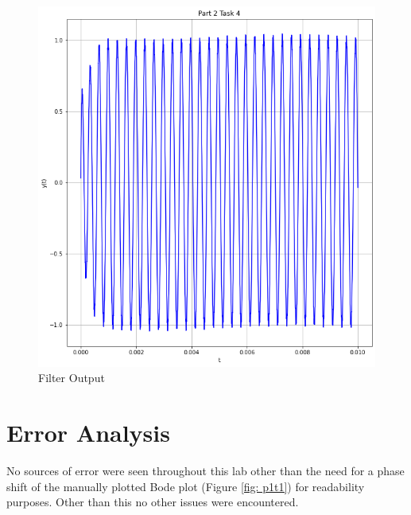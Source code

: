 \documentclass[12pt]{report}
\begin{document}
\begin{figure}[h!]
  \centering
  \includegraphics[width=\linewidth]{p2t2.png}
  \caption{Filter Output}
  \label{fig: p2t2}
\end{figure}


\section{Error Analysis}\label{section: ErAn}
No sources of error were seen throughout this lab other than the need for a phase shift of the manually plotted Bode plot (Figure \ref{fig: p1t1}) for readability purposes.
Other than this no other issues were encountered.
\end{document}
